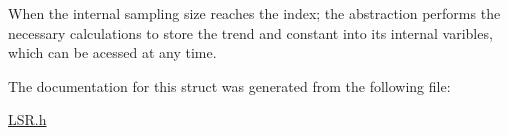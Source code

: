 When the internal sampling size reaches the index; the abstraction performs the necessary calculations to store the trend and constant into its internal varibles, which can be acessed at any time. 

The documentation for this struct was generated from the following file\+:\begin{DoxyCompactItemize}
\item 
\hyperlink{_l_s_r_8h}{L\+S\+R.\+h}\end{DoxyCompactItemize}
